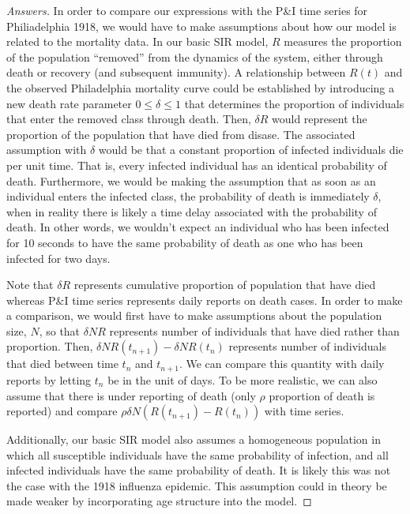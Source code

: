\documentclass[12pt]{article}
\begin{document}
\begin{enumerate}[(a)]
\begin{enumerate}[(i)]
{\color{blue}
\begin{proof}[Answers]
In order to compare our expressions with the P\&I time series for Philiadelphia 1918, we would have to make assumptions about how our model is related to the mortality data. 
In our basic SIR model, $R$ measures the proportion of the population ``removed'' from the dynamics of the system, either through death or recovery (and subsequent immunity). A relationship between $R(t)$ and the observed Philadelphia mortality curve could be established by introducing a new death rate parameter $0 \leq \delta \leq 1$ that determines the proportion of individuals that enter the removed class through death.
Then, $\delta R$ would represent the proportion of the population that have died from disase.
The associated assumption with $\delta$ would be that a constant proportion of infected individuals die per unit time. That is, every infected individual has an identical probability of death. Furthermore, we would be making the assumption that as soon as an individual enters the infected class, the probability of death is immediately $\delta$, when in reality there is likely a time delay associated with the probability of death. In other words, we wouldn't expect an individual who has been infected for 10 seconds to have the same probability of death as one who has been infected for two days.

Note that $\delta R$ represents cumulative proportion of population that have died whereas P\&I time series represents daily reports on death cases. 
In order to make a comparison, we would first have to make assumptions about the population size, $N$, so that $\delta N R$ represents number of individuals that have died rather than proportion.
Then, $\delta N R (t_{n+1}) - \delta N R (t_n)$ represents number of individuals that died between time $t_n$ and $t_{n+1}$. 
We can compare this quantity with daily reports by letting $t_n$ be in the unit of days.
To be more realistic, we can also assume that there is under reporting of death (only $\rho$ proportion of death is reported) and compare $\rho \delta N (R(t_{n+1}) - R(t_n))$ with time series.

Additionally, our basic SIR model also assumes a homogeneous population in which all susceptible individuals have the same probability of infection, and all infected individuals have the same probability of death. It is likely this was not the case with the 1918 influenza epidemic. This assumption could in theory be made weaker by incorporating age structure into the model.


\end{proof}}
\end{enumerate}
\end{enumerate}
\end{document}
